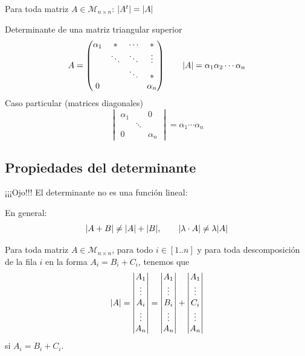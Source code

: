 \documentclass[11pt,a4paper]{article}
\newcommand{\M}{\mathcal{M}}
\begin{document}
\begin{proposicion}
Para toda matriz $A\in\M_{n\times n}$: $\lvert A^t\rvert=\lvert A\rvert$
\end{proposicion}

\begin{ejemplo}
Determinante de una matriz triangular superior
\[
A=\begin{pmatrix}\alpha_1&*&\cdots&*\\&\ddots&\ddots&\vdots\\&&\ddots&*\\0&&&\alpha_n\end{pmatrix}
\qquad \lvert A\rvert=\alpha_1\alpha_2\cdots\alpha_n
\]
Caso particular (matrices diagonales)
\[
\begin{vmatrix}\alpha_1&&0\\&\ddots&\\0&&\alpha_n\end{vmatrix}=\alpha_1\cdots\alpha_n
\]
\end{ejemplo}

\subsection{Propiedades del determinante}

¡¡¡Ojo!!! El determinante no es una función lineal:

En general:
\[
\lvert A+B\rvert\neq\lvert A\rvert+\lvert B\rvert,\qquad \lvert\lambda\cdot A\rvert\neq\lambda\lvert A\rvert
\]

\begin{proposicion}
Para toda matriz $A\in\M_{n\times n}$, para todo $i\in[1..n]$ y para toda descomposición de la fila $i$ en la forma $A_i=B_i+C_i$, tenemos que
\[
\lvert A\rvert=\begin{vmatrix}A_1\\\vdots\\A_i\\\vdots\\A_n\end{vmatrix}
=\begin{vmatrix}A_1\\\vdots\\B_i\\\vdots\\A_n\end{vmatrix}
+\begin{vmatrix}A_1\\\vdots\\C_i\\\vdots\\A_n\end{vmatrix}
\]
si $A_i=B_i+C_i$.
\end{proposicion}
\end{document}

